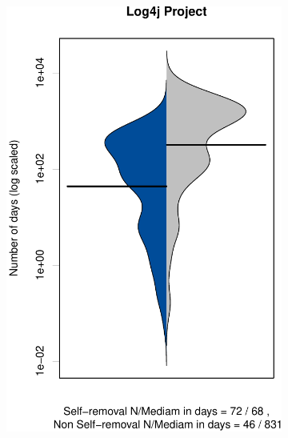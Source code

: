 \begin{figure}[t]
\begin{subfigure}[b]{0.191\textwidth}
		\includegraphics[width=\textwidth]{figures/test/Log4j.pdf}
		\label{fig:removal_comparison_log4j}
	\end{subfigure}
	\begin{subfigure}[b]{0.195\textwidth}

\end{subfigure}
\end{figure}
